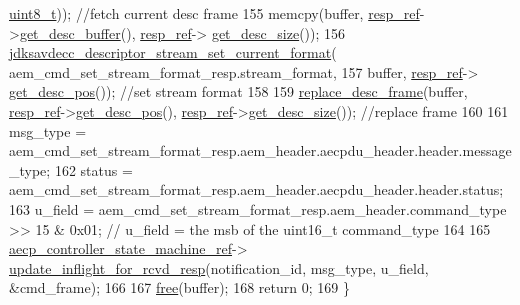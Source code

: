 \begin{DoxyCode}
      \hyperlink{stdint_8h_aba7bc1797add20fe3efdf37ced1182c5}{uint8\_t})); \textcolor{comment}{//fetch current desc frame}
155     memcpy(buffer, \hyperlink{classavdecc__lib_1_1descriptor__base__imp_a2642e3a7c10d38553e7ff4a55e875346}{resp\_ref}->\hyperlink{classavdecc__lib_1_1response__frame_a87db6e7ad7e047437cf9c9eaab873626}{get\_desc\_buffer}(), \hyperlink{classavdecc__lib_1_1descriptor__base__imp_a2642e3a7c10d38553e7ff4a55e875346}{resp\_ref}->
      \hyperlink{classavdecc__lib_1_1response__frame_a5302ae13c549f066040ce0e7c7d11ae6}{get\_desc\_size}());
156     \hyperlink{group__descriptor__stream_ga548deb717063430826d2498e6329e06f}{jdksavdecc\_descriptor\_stream\_set\_current\_format}(
      aem\_cmd\_set\_stream\_format\_resp.stream\_format,
157                                                     buffer, \hyperlink{classavdecc__lib_1_1descriptor__base__imp_a2642e3a7c10d38553e7ff4a55e875346}{resp\_ref}->
      \hyperlink{classavdecc__lib_1_1response__frame_a6e6f6cc3d681d41c6de6139ca9cb79d9}{get\_desc\_pos}()); \textcolor{comment}{//set stream format}
158 
159     \hyperlink{classavdecc__lib_1_1descriptor__base__imp_a8dbf7d4faedf36ec789d33f228e22039}{replace\_desc\_frame}(buffer, \hyperlink{classavdecc__lib_1_1descriptor__base__imp_a2642e3a7c10d38553e7ff4a55e875346}{resp\_ref}->\hyperlink{classavdecc__lib_1_1response__frame_a6e6f6cc3d681d41c6de6139ca9cb79d9}{get\_desc\_pos}(), 
      \hyperlink{classavdecc__lib_1_1descriptor__base__imp_a2642e3a7c10d38553e7ff4a55e875346}{resp\_ref}->\hyperlink{classavdecc__lib_1_1response__frame_a5302ae13c549f066040ce0e7c7d11ae6}{get\_desc\_size}()); \textcolor{comment}{//replace frame}
160 
161     msg\_type = aem\_cmd\_set\_stream\_format\_resp.aem\_header.aecpdu\_header.header.message\_type;
162     status = aem\_cmd\_set\_stream\_format\_resp.aem\_header.aecpdu\_header.header.status;
163     u\_field = aem\_cmd\_set\_stream\_format\_resp.aem\_header.command\_type >> 15 & 0x01; \textcolor{comment}{// u\_field = the msb of
       the uint16\_t command\_type}
164 
165     \hyperlink{namespaceavdecc__lib_a0b1b5aea3c0490f77cbfd9178af5be22}{aecp\_controller\_state\_machine\_ref}->
      \hyperlink{classavdecc__lib_1_1aecp__controller__state__machine_a997abd9786c330a5505e903e6443208e}{update\_inflight\_for\_rcvd\_resp}(notification\_id, msg\_type, u\_field, &cmd\_frame);
166 
167     \hyperlink{_memory_leak_detector_malloc_macros_8h_aa7157aa9480bb73f090dca36776419bf}{free}(buffer);
168     \textcolor{keywordflow}{return} 0;
169 \}
\end{DoxyCode}


